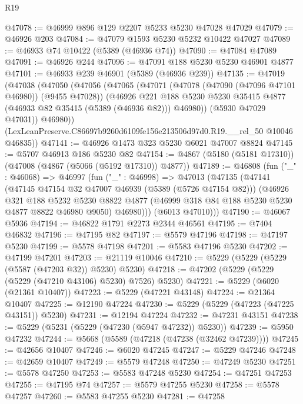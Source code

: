 \begin{lexlean}{R19}
\begin{coremodule}
@47078 := @46999 @896 @129 @2207 @5233 @5230 @47028 @47029
@47079 := @46926 @203
@47084 := @47079 @1593 @5230 @5232 @10422 @47027
@47089 := @46933 @74 @10422 (@5389 (@46936 @74))
@47090 := @47084 @47089
@47091 := @46926 @244
@47096 := @47091 @188 @5230 @5230 @46901 @4877
@47101 := @46933 @239 @46901 (@5389 (@46936 @239))
@47135 := @47019
    (@47038
      (@47050
        (@47056
          (@47065
            (@47071
              (@47078 (@47090 (@47096 @47101 @46980)) (@9455 @47028))
              (@46926
                @221
                @188
                @5230
                @5230
                @35415
                @4877
                (@46933 @82 @35415 (@5389 (@46936 @82)))
                @46980))
            (@5930 @47029 @47031))
          @46980))
      (LexLeanPreserve.C86697b9260d6109fe156e213506d97d0.R19.__rel_50 @10046 @46835))
@47141 := @46926 @1473 @323 @5230 @6021 @47007 @8824
@47145 := @5707 @46913 @186 @5230 @82
@47154 := @4867 (@5180 (@5181 @17310)) (@47008 (@4867 (@5066 (@5192 @17310)) @4877))
@47189 := @46808
    (fun ("_" : @46068) =>
    @46997
      (fun ("_" : @46998) =>
      @47013
        (@47135
          (@47141
            (@47145 @47154 @32 @47007 @46939 (@5389 (@5726 @47154 @82)))
            (@46926
              @321
              @188
              @5232
              @5230
              @8822
              @4877
              (@46999 @318 @84 @188 @5230 @5230 @4877 @8822 @46980 @9050)
              @46980)))
        (@6013 @47010)))
@47190 := @46067 @5936
@47194 := @46822 @1791 @2273 @2344 @46561
@47195 := @7404 @46832
@47196 := @47195 @82
@47197 := @5579 @47196
@47198 := @47197 @5230
@47199 := @5578 @47198
@47201 := @5583 @47196 @5230
@47202 := @47199 @47201
@47203 := @21119 @10046
@47210 := @5229 (@5229 (@5229 (@5587 (@47203 @32)) @5230) @5230)
@47218 := @47202 (@5229 (@5229 (@5229 (@47210 @43106) @5230) @7526) @5230)
@47221 := @5229 (@6020 (@21361 @10407))
@47223 := @5229 (@47221 @43148)
@47224 := @21364 @10407
@47225 := @12190 @47224
@47230 := @5229 (@5229 (@47223 (@47225 @43151)) @5230)
@47231 := @12194 @47224
@47232 := @47231 @43151
@47238 := @5229 (@5231 (@5229 (@47230 (@5947 @47232)) @5230))
@47239 := @5950 @47232
@47244 := @5668 (@5589 (@47218 (@47238 (@32462 @47239))))
@47245 := @42656 @10407
@47246 := @6020 @47245
@47247 := @5229 @47246
@47248 := @42659 @10407
@47249 := @5579 @47248
@47250 := @47249 @5230
@47251 := @5578 @47250
@47253 := @5583 @47248 @5230
@47254 := @47251 @47253
@47255 := @47195 @74
@47257 := @5579 @47255 @5230
@47258 := @5578 @47257
@47260 := @5583 @47255 @5230
@47281 := @47258

\end{coremodule}
\end{lexlean}
